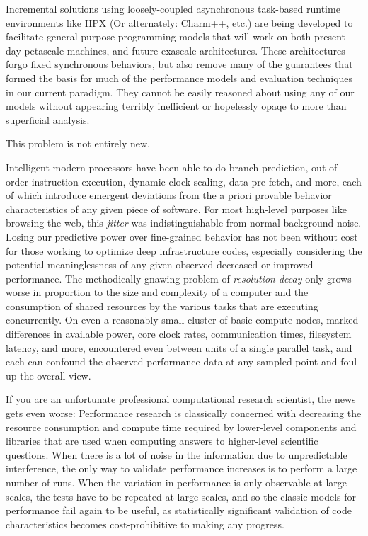Incremental solutions using loosely-coupled asynchronous task-based
runtime environments \cite{kaiser2014hpx} like HPX (Or alternately:
Charm++, etc.)  are being developed to facilitate general-purpose
programming models that will work on both present day petascale
machines, and future exascale architectures. These architectures forgo
fixed synchronous behaviors, but also remove many of the guarantees
that formed the basis for much of the performance models and
evaluation techniques in our current paradigm. They cannot be easily
reasoned about using any of our models without appearing terribly
inefficient or hopelessly opaqe to more than superficial analysis.

This problem is not entirely new.

Intelligent modern processors have been able to do branch-prediction,
out-of-order instruction execution, dynamic clock scaling, data
pre-fetch, and more, each of which introduce emergent deviations from
the a priori provable behavior characteristics of any given piece of
software. For most high-level purposes like browsing the web, this
\textit{jitter} was indistinguishable from normal background
noise. Losing our predictive power over fine-grained behavior has not
been without cost for those working to optimize deep infrastructure
codes, especially considering the potential meaninglessness of any
given observed decreased or improved performance. The
methodically-gnawing problem of \textit{resolution decay} only grows
worse in proportion to the size and complexity of a computer and the
consumption of shared resources by the various tasks that are
executing concurrently.  On even a reasonably small cluster of basic
compute nodes, marked differences in available power, core clock
rates, communication times, filesystem latency, and more, encountered
even between units of a single parallel task, and each can confound
the observed performance data at any sampled point and foul up the
overall view.

If you are an unfortunate professional computational research
scientist, the news gets even worse: Performance research is
classically concerned with decreasing the resource consumption and
compute time required by lower-level components and libraries that are
used when computing answers to higher-level scientific questions.
When there is a lot of noise in the information due to unpredictable
interference, the only way to validate performance increases is to
perform a large number of runs. When the variation in performance is
only observable at large scales, the tests have to be repeated at
large scales, and so the classic models for performance fail again to
be useful, as statistically significant validation of code
characteristics becomes cost-prohibitive to making any progress.

